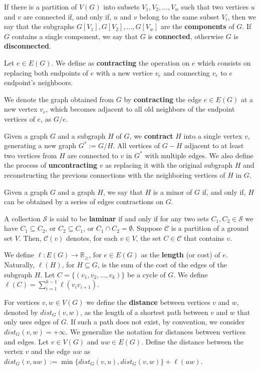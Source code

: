 If there is a partition of \(V(G)\) into subsets \(V_1 , V_2 , \dots, V_w\) such that two vertices \(u\) and \(v\) are connected if, and only if, \(u\) and \(v\) belong to the same subset \(V_i\), then we say that the subgraphs \(G[V_1], G[V_2], \dots, G[V_w]\) are the \textbf{components} of \(G\). If \(G\) contains a single component, we say that \(G\) is \textbf{connected}, otherwise \(G\) is \textbf{disconnected}.

Let \(e \in E(G)\). We define as \textbf{contracting} the operation on \(e\) which consists on replacing both endpoints of \(e\) with a new vertice \(v_e\) and connecting \(v_e\) to \(e\) endpoint's neighboors.

We denote the graph obtained from \(G\) by \textbf{contracting} the edge \(e \in E(G)\) at a new vertex \(v_e\), which becomes adjacent to all old neighbors of the endpoint vertices of \(e\), as \(G / e\).

Given a graph \(G\) and a subgraph \(H\) of \(G\), we \textbf{contract} \(H\) into a single vertex \(v\), generating a new graph \(G^\ast := G / H\). All vertices of \(G - H\) adjacent to at least two vertices from \(H\) are connected to \(v\) in \(G^\ast\) with multiple edges. We also define the process of \textbf{uncontracting} \(v\) as replacing it with the original subgraph \(H\) and reconstructing the previous connections with the neighboring vertices of \(H\) in \(G\).

Given a graph \(G\) and a graph \(H\), we say that \(H\) is a minor of \(G\) if, and only if, \(H\) can be obtained by a series of edges contractions on \(G\).

A collection \(\mathcal{S}\) is said to be \textbf{laminar} if and only if for any two sets \(C_1, C_2 \in \mathcal{S}\) we have \(C_1 \subseteq C_2\), or \(C_2 \subseteq C_1\), or \(C_1 \cap C_2 = \emptyset\). Suppose \(\mathcal{C}\) is a partition of a ground set \(V\). Then, \(\mathcal{C}(v)\) denotes, for each \(v \in V\), the set \(C \in \mathcal{C}\) that contains \(v\).

We define \(\ell \colon E(G) \to \mathbb{R}_\ge\), for \(e \in E(G)\) as the \textbf{length} (or cost) of \(e\). Naturally, \(\ell(H)\), for \(H \subseteq G\), is the sum of the cost of the edges of the subgraph \(H\). Let \(C = \{(v_1, v_2, \dots, v_k)\}\) be a cycle of \(G\). We define \(\ell(C) = \sum_{i=1}^{k-1} \ell(v_i v_{i+1})\).

For vertices \(v, w \in V(G)\) we define the \textbf{distance} between vertices $v$ and $w$, denoted by \(dist_G(v, w)\), as the length of a shortest path between \(v\) and \(w\) that only uses edges of \(G\). If such a path does not exist, by convention, we consider \(dist_G(v, w) = +\infty\). We generalize the notation for distances between vertices and edges. Let \(v \in V(G)\) and \(uw \in E(G)\). Define the distance between the vertex \(v\) and the edge \(uw\) as \(dist_G(v, uw) := \min\{dist_G(v, u), dist_G(v, w)\} + \ell(uw)\).

